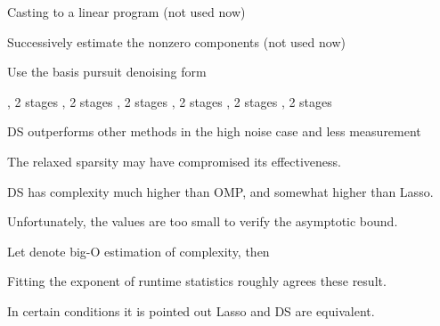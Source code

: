 {
\I Casting to a linear program (not used now)

\I Successively estimate the nonzero components (not used now)

\I Use the basis pursuit denoising form

}
{
\I {}, 2 stages
\blank [big]
}
{
\I {}, 2 stages
\blank [big]
}
{
\I {}, 2 stages
\blank [big]
}
{
\I {}, 2 stages
\blank [big]
}
{
\I {}, 2 stages
\blank [big]
}
{
\I {}, 2 stages
\blank [big]
}
{
\I DS outperforms other methods in the high noise case and less measurement

\I The relaxed sparsity may have compromised its effectiveness.

\I DS has complexity much higher than OMP, and somewhat higher than Lasso.

\I Unfortunately, the values are too small to verify the asymptotic bound.
}
{
\I Let  denote big-O estimation of complexity, then

\I Fitting the exponent of runtime statistics roughly agrees these result.

\I In certain conditions it is pointed out Lasso and DS are equivalent.
}


